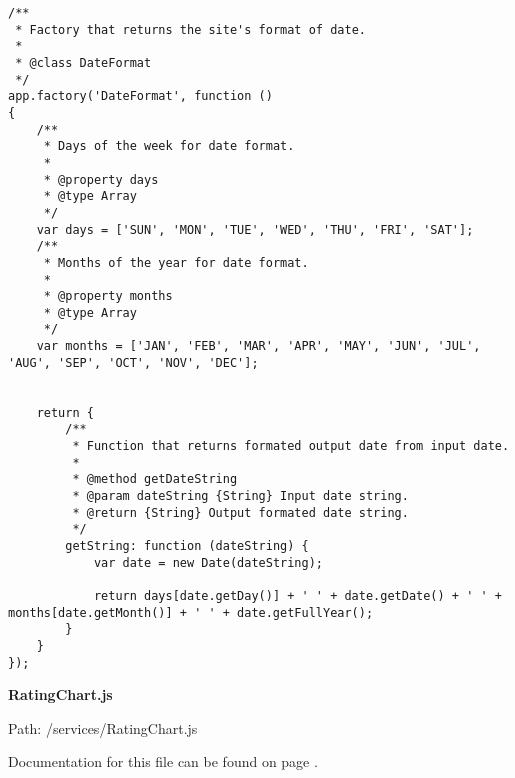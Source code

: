 {\scriptsize
\begin{lstlisting}
/**
 * Factory that returns the site's format of date.
 *
 * @class DateFormat
 */
app.factory('DateFormat', function ()
{
	/**
	 * Days of the week for date format.
	 *
	 * @property days
	 * @type Array
	 */
	var days = ['SUN', 'MON', 'TUE', 'WED', 'THU', 'FRI', 'SAT'];
	/**
	 * Months of the year for date format.
	 *
	 * @property months
	 * @type Array
	 */
	var months = ['JAN', 'FEB', 'MAR', 'APR', 'MAY', 'JUN', 'JUL', 'AUG', 'SEP', 'OCT', 'NOV', 'DEC'];


	return {
		/**
		 * Function that returns formated output date from input date.
		 *
		 * @method getDateString
		 * @param dateString {String} Input date string.
		 * @return {String} Output formated date string.
		 */
		getString: function (dateString) {
			var date = new Date(dateString);

			return days[date.getDay()] + ' ' + date.getDate() + ' ' + months[date.getMonth()] + ' ' + date.getFullYear();
		}
	}
});\end{lstlisting}
}
\textbf{RatingChart.js}\label{RatingChart.js}

Path: /services/RatingChart.js

Documentation for this file can be found on page \pageref{RatingChart.js.doc}.

